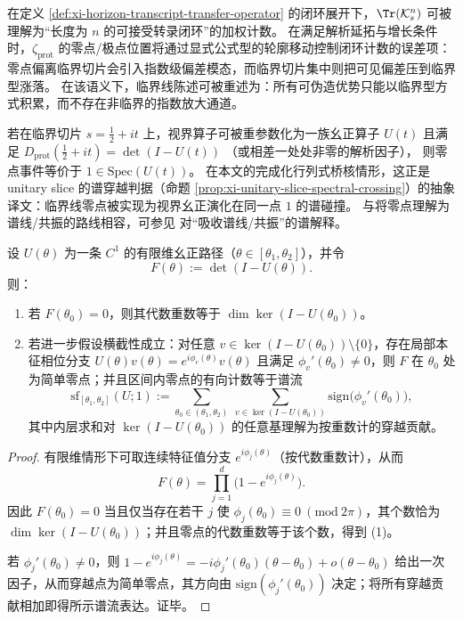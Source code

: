 \begin{remark}\label{rem:xi-hzom-zero-soundness-duality}
在定义 \ref{def:xi-horizon-transcript-transfer-operator} 的闭环展开下，\(\Tr(\mathcal{K}_s^n)\) 可被理解为“长度为 \(n\) 的可接受转录闭环”的加权计数。
在满足解析延拓与增长条件时，\(\zeta_{\mathrm{prot}}\) 的零点/极点位置将通过显式公式型的轮廓移动控制闭环计数的误差项：零点偏离临界切片会引入指数级偏差模态，而临界切片集中则把可见偏差压到临界型涨落。
在该语义下，临界线陈述可被重述为：所有可伪造优势只能以临界型方式积累，而不存在非临界的指数放大通道。
\end{remark}

\begin{corollary}\label{cor:xi-hzom-unitary-slice}
若在临界切片 \(s=\tfrac12+it\) 上，视界算子可被重参数化为一族幺正算子 \(U(t)\) 且满足
\(
D_{\mathrm{prot}}(\tfrac12+it)=\det(I-U(t))
\)
（或相差一处处非零的解析因子），
则零点事件等价于 \(1\in\mathrm{Spec}(U(t))\)。
在本文的完成化行列式桥核情形，这正是 unitary slice 的谱穿越判据（命题 \ref{prop:xi-unitary-slice-spectral-crossing}）的抽象译文：临界线零点被实现为视界幺正演化在同一点 \(1\) 的谱碰撞。
与将零点理解为谱线/共振的路线相容，可参见 \cite{Connes1999TraceFormulaNCG} 对“吸收谱线/共振”的谱解释。
\end{corollary}

\begin{theorem}\label{thm:xi-unitary-slice-zero-count-spectral-flow}
设 \(U(\theta)\) 为一条 \(C^{1}\) 的有限维幺正路径（\(\theta\in[\theta_1,\theta_2]\)），并令
\[
F(\theta):=\det(I-U(\theta)).
\]
则：
\begin{enumerate}
  \item 若 \(F(\theta_0)=0\)，则其代数重数等于 \(\dim\ker(I-U(\theta_0))\)。
  \item 若进一步假设横截性成立：对任意 \(v\in\ker(I-U(\theta_0))\setminus\{0\}\)，存在局部本征相位分支 \(U(\theta)v(\theta)=e^{i\phi_v(\theta)}v(\theta)\) 且满足 \(\phi_v'(\theta_0)\neq 0\)，则 \(F\) 在 \(\theta_0\) 处为简单零点；并且区间内零点的有向计数等于谱流
  \[
  \mathrm{sf}_{[\theta_1,\theta_2]}(U;1)
  :=
  \sum_{\theta_0\in(\theta_1,\theta_2)}\ \sum_{v\in\ker(I-U(\theta_0))}\mathrm{sign}\bigl(\phi_v'(\theta_0)\bigr),
  \]
  其中内层求和对 \(\ker(I-U(\theta_0))\) 的任意基理解为按重数计的穿越贡献。
\end{enumerate}
\end{theorem}

\begin{proof}
有限维情形下可取连续特征值分支 \(e^{i\phi_j(\theta)}\)（按代数重数计），从而
\[
F(\theta)=\prod_{j=1}^{d}\bigl(1-e^{i\phi_j(\theta)}\bigr).
\]
因此 \(F(\theta_0)=0\) 当且仅当存在若干 \(j\) 使 \(\phi_j(\theta_0)\equiv 0\ (\mathrm{mod}\ 2\pi)\)，其个数恰为 \(\dim\ker(I-U(\theta_0))\)；并且零点的代数重数等于该个数，得到 (1)。
\par
若 \(\phi_j'(\theta_0)\neq 0\)，则
\(
1-e^{i\phi_j(\theta)}=-i\phi_j'(\theta_0)(\theta-\theta_0)+o(\theta-\theta_0)
\)
给出一次因子，从而穿越点为简单零点，其方向由 \(\mathrm{sign}(\phi_j'(\theta_0))\) 决定；将所有穿越贡献相加即得所示谱流表达。证毕。
\end{proof}

